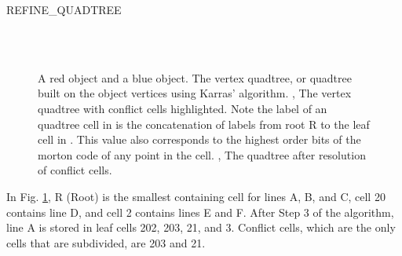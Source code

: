 \documentclass{egpubl}
\begin{document}
\algorithmspace
\begin{algorithm}
  \DontPrintSemicolon
  \LinesNumbered
  \BlankLine
\caption{REFINE\_QUADTREE}
\label{alg:refine-quadtree}
\end{algorithm}
\algorithmspace

\begin{figure}
  \centering
   \\
   \\
  \caption{
    \protect{} A red object and a blue object.
    \protect{} The vertex quadtree, or quadtree built on the object vertices using Karras' algorithm.
    \protect{}, \protect{} The vertex quadtree with conflict cells highlighted. Note the label of an quadtree cell in \protect{} is the concatenation of labels from root R to the leaf cell in \protect{}. This value also corresponds to the highest order bits of the morton code of any point in the cell.
    \protect{}, \protect{} The quadtree after resolution of conflict cells.
  }
  \label{fig:steps}
\end{figure}

In Fig. \ref{fig:steps}, R (Root) is the smallest containing cell for lines A, B, and C, cell 20 contains line D, and cell 2 contains lines E and F. After Step 3 of the algorithm, line A is stored in leaf cells 202, 203, 21, and 3. Conflict cells, which are the only cells that are subdivided, are 203 and 21.
\end{document}
